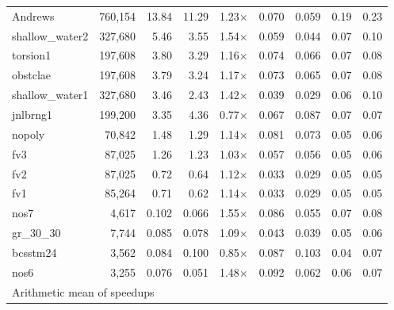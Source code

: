 \documentclass{article}
\newcommand{\1}{\mathbbm{1}}
\theoremstyle{plain}
\begin{document}
\begin{table}[!t]
\begin{tabular}{l r rr r rr rr}
Andrews          &   760{,}154 &  13.84 &  11.29 & 1.23$\times$ & 0.070 & 0.059 & 0.19 & 0.23 \\

shallow\_water2  &   327{,}680 &   5.46 &   3.55 & 1.54$\times$ & 0.059 & 0.044 & 0.07 & 0.10 \\

torsion1         &   197{,}608 &   3.80 &   3.29 & 1.16$\times$ & 0.074 & 0.066 & 0.07 & 0.08 \\

obstclae         &   197{,}608 &   3.79 &   3.24 & 1.17$\times$ & 0.073 & 0.065 & 0.07 & 0.08 \\

shallow\_water1  &   327{,}680 &   3.46 &   2.43 & 1.42$\times$ & 0.039 & 0.029 & 0.06 & 0.10 \\

jnlbrng1         &   199{,}200 &   3.35 &   4.36 & 0.77$\times$ & 0.067 & 0.087 & 0.07 & 0.07 \\

nopoly           &    70{,}842 &   1.48 &   1.29 & 1.14$\times$ & 0.081 & 0.073 & 0.05 & 0.06 \\

fv3              &    87{,}025 &   1.26 &   1.23 & 1.03$\times$ & 0.057 & 0.056 & 0.05 & 0.06 \\

fv2              &    87{,}025 &   0.72 &   0.64 & 1.12$\times$ & 0.033 & 0.029 & 0.05 & 0.05 \\

fv1              &    85{,}264 &   0.71 &   0.62 & 1.14$\times$ & 0.033 & 0.029 & 0.05 & 0.05 \\

nos7             &     4{,}617 &   0.102 &  0.066 & 1.55$\times$ & 0.086 & 0.055 & 0.07 & 0.08 \\

gr\_30\_30       &     7{,}744 &   0.085 &  0.078 & 1.09$\times$ & 0.043 & 0.039 & 0.05 & 0.06 \\

bcsstm24         &     3{,}562 &   0.084 &  0.100 & 0.85$\times$ & 0.087 & 0.103 & 0.04 & 0.07 \\

nos6             &     3{,}255 &   0.076 &  0.051 & 1.48$\times$ & 0.092 & 0.062 & 0.06 & 0.07 \\

\midrule

\multicolumn{4}{l}{Arithmetic mean of speedups}


\end{tabular}
\end{table}
\end{document}
